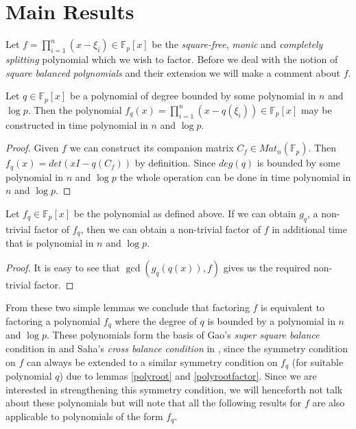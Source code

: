 \chapter{Main Results}

Let $f=\prod_{i=1}^n (x-\xi_i) \in \mathbb{F}_p[x]$ be the \emph{square-free}, \emph{monic} and \emph{completely splitting} polynomial which we wish to factor. Before we deal with the notion of \emph{square balanced polynomials} and
their extension we will make a comment about $f$.

\begin{lemma}\label{polyroot}
	Let $q \in \mathbb{F}_p[x]$ be a polynomial of degree bounded by some polynomial in $n$ and $\log{p}$. Then the polynomial $f_q(x) = \prod_{i=1}^n (x-q(\xi_i)) \in \mathbb{F}_p[x]$ may be constructed in time polynomial in $n$
	and $\log{p}$.
\end{lemma}

\begin{proof}
	Given $f$ we can construct its companion matrix $C_f\in Mat_n(\mathbb{F}_p)$. Then $f_q(x) = det(xI-q(C_f))$ by definition. Since $deg(q)$ is bounded by some polynomial in $n$ and $\log{p}$ the whole
	operation can be done in time polynomial in $n$ and $\log{p}$.
\end{proof}

\begin{lemma}\label{polyrootfactor}
	Let $f_q \in \mathbb{F}_p[x]$ be the polynomial as defined above. If we can obtain $g_q$, a non-trivial factor of $f_q$, then we can obtain a non-trivial factor of $f$ in additional time that is polynomial in $n$ and $\log{p}$.
\end{lemma}

\begin{proof}
	It is easy to see that $\gcd(g_q(q(x)),f)$ gives us the required non-trivial factor.
\end{proof}

From these two simple lemmas we conclude that factoring $f$ is equivalent to factoring a polynomial $f_q$ where the degree of $q$ is bounded by a polynomial in $n$ and $\log{p}$. These polynomials form the basis of Gao's
\emph{super square balance} condition in \cite{gao2001deterministic} and Saha's \emph{cross balance condition} in \cite{saha2008factoring}, since the symmetry condition on $f$ can always be extended to a similar symmetry condition
on $f_q$ (for suitable polynomial $q$) due to lemmas \ref{polyroot} and \ref{polyrootfactor}. Since we are interested in strengthening this symmetry condition, we will henceforth not talk about these polynomials but will note that
all the following results for $f$ are also applicable to polynomials of the form $f_q$.

